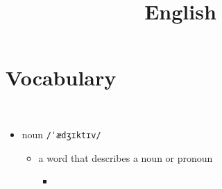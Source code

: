 \documentclass{blog}
\title{English}
\begin{document}
\maketitle
\tableofcontents

\section{Vocabulary}
\begin{definition}[adjective]~
    \begin{itemize}
        \item noun \verb|/ˈædʒɪktɪv/|
              \begin{itemize}
                  \item a word that describes a noun or pronoun
                        \begin{itemize}
                            \item
                        \end{itemize}
              \end{itemize}
    \end{itemize}
\end{definition}






\end{document}
